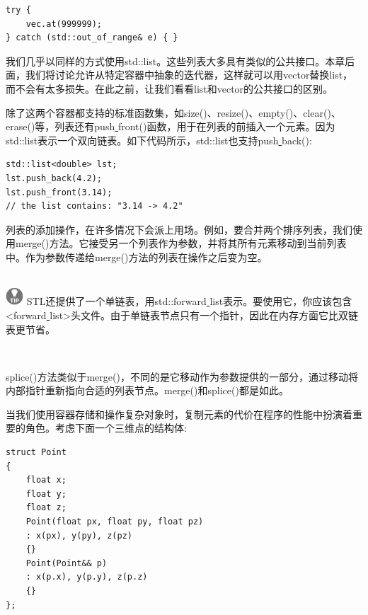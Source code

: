 \begin{lstlisting}[caption={}]
try {
	vec.at(999999);
} catch (std::out_of_range& e) { }
\end{lstlisting}

我们几乎以同样的方式使用std::list。这些列表大多具有类似的公共接口。本章后面，我们将讨论允许从特定容器中抽象的迭代器，这样就可以用vector替换list，而不会有太多损失。在此之前，让我们看看list和vector的公共接口的区别。 \par
除了这两个容器都支持的标准函数集，如size()、resize()、empty()、clear()、erase()等，列表还有push\underline{ }front()函数，用于在列表的前插入一个元素。因为std::list表示一个双向链表。如下代码所示，std::list也支持push\underline{ }back(): \par

\begin{lstlisting}[caption={}]
std::list<double> lst;
lst.push_back(4.2);
lst.push_front(3.14);
// the list contains: "3.14 -> 4.2"
\end{lstlisting}

列表的添加操作，在许多情况下会派上用场。例如，要合并两个排序列表，我们使用merge()方法。它接受另一个列表作为参数，并将其所有元素移动到当前列表中。作为参数传递给merge()方法的列表在操作之后变为空。 \par

\hspace*{\fill} \\ %
\includegraphics[width=0.05\textwidth]{images/tip}
STL还提供了一个单链表，用std::forward\underline{ }list表示。要使用它，你应该包含<forward\underline{ }list>头文件。由于单链表节点只有一个指针，因此在内存方面它比双链表更节省。 \par
\noindent\textbf{}\ \par

splice()方法类似于merge()，不同的是它移动作为参数提供的一部分，通过移动将内部指针重新指向合适的列表节点。merge()和splice()都是如此。 \par
当我们使用容器存储和操作复杂对象时，复制元素的代价在程序的性能中扮演着重要的角色。考虑下面一个三维点的结构体: \par

\begin{lstlisting}[caption={}]
struct Point
{
	float x;
	float y;
	float z;
	Point(float px, float py, float pz)
	: x(px), y(py), z(pz)
	{}
	Point(Point&& p)
	: x(p.x), y(p.y), z(p.z)
	{}
};
\end{lstlisting}

